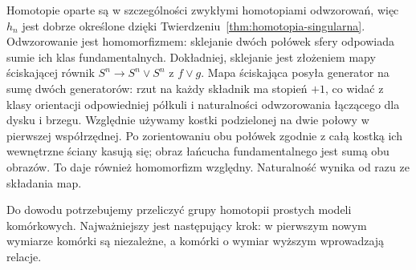 \documentclass[11pt,a4paper,oneside]{report}
\theoremstyle{plain}
\theoremstyle{definition}
\theoremstyle{remark}
\begin{document}
Homotopie oparte są w
szczególności zwykłymi
homotopiami odwzorowań, więc
$h_n$ jest dobrze
określone dzięki
Twierdzeniu~\ref{thm:homotopia-singularna}.
Odwzorowanie jest homomorfizmem:
sklejanie dwóch połówek
sfery odpowiada sumie
ich klas fundamentalnych.
Dokładniej, sklejanie jest złożeniem mapy ściskającej równik
$S^n\to S^n\vee S^n$ z $f\vee g$. Mapa ściskająca posyła
generator na sumę dwóch generatorów: rzut na każdy składnik
ma stopień $+1$, co widać z klasy orientacji odpowiedniej półkuli
i naturalności odwzorowania łączącego dla dysku i brzegu.
Względnie używamy kostki podzielonej na dwie połowy w pierwszej współrzędnej.
Po zorientowaniu obu połówek zgodnie z całą kostką ich wewnętrzne
ściany kasują się; obraz łańcucha fundamentalnego jest sumą obu obrazów.
To daje również homomorfizm względny. Naturalność wynika od razu ze składania map.

Do dowodu potrzebujemy
przeliczyć grupy homotopii
prostych modeli komórkowych.
Najważniejszy jest
następujący krok: w
pierwszym nowym wymiarze
komórki są niezależne,
a komórki o wymiar
wyższym wprowadzają
relacje.
\end{document}
